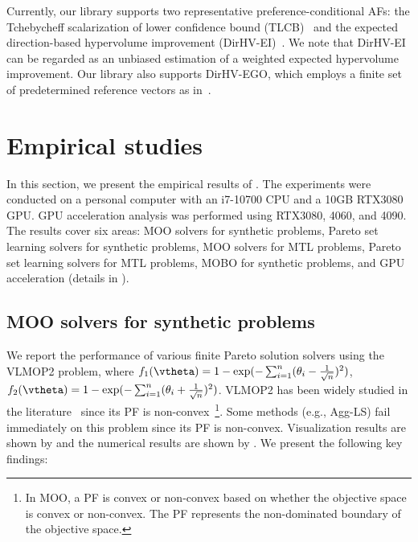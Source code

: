 Currently, our library supports two representative preference-conditional AFs: the Tchebycheff scalarization of lower confidence bound (TLCB)~\cite{lin2017cec,lin2022pslmobo,paria2020flexible} and the expected direction-based hypervolume improvement (DirHV-EI)~\cite{zhao2024hypervolume}. We note that DirHV-EI can be regarded as an unbiased estimation of a weighted expected hypervolume improvement. Our library also supports DirHV-EGO, which employs a finite set of predetermined reference vectors as in~\cite{zhang2007moea}.

\section{Empirical studies} \label{sec:results}
In this section, we present the empirical results of \algoname. The experiments were conducted on a personal computer with an i7-10700 CPU and a 10GB RTX3080 GPU. GPU acceleration analysis was performed using RTX3080, 4060, and 4090. The results cover six areas: MOO solvers for synthetic problems, Pareto set learning solvers for synthetic problems, MOO solvers for MTL problems, Pareto set learning solvers for MTL problems, MOBO for synthetic problems, and GPU acceleration (details in ).

\subsection{MOO solvers for synthetic problems}
We report the performance of various finite Pareto solution solvers using the VLMOP2 problem, where $f_1(\vtheta) = 1 - \exp (-\sum_{i=1}^{n} (\theta_i - \frac{1}{\sqrt{n}} )^2 )$, $f_2(\vtheta) = 1 - \exp (-\sum_{i=1}^{n} (\theta_i + \frac{1}{\sqrt{n}})^2)$. VLMOP2 has been widely studied in the literature~\cite{mahapatra2020multi,lin2019pareto} since its PF is non-convex~\footnote{In MOO, a PF is convex or non-convex based on whether the objective space is convex or non-convex. The PF represents the non-dominated boundary of the objective space.}. Some methods (e.g., Agg-LS) fail immediately on this problem since its PF is non-convex. Visualization results are shown by  and the numerical results are shown by . We present the following key findings:

